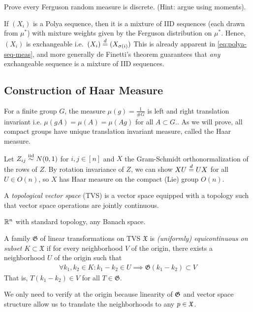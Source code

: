 \begin{exercise}
  Prove every Ferguson random measure is discrete.
  (Hint: argue using moments).
\end{exercise}


\begin{remark}
  If $(X_i)$ is a Polya sequence, then
  it is a mixture of IID sequences (each
  drawn from $\mu^*$) with mixture weights given by the Ferguson distribution
  on $\mu^*$. Hence, $(X_i)$ is exchangeable i.e.\ $(X_i) \overset{d}{=} (X_{\sigma(i)})$
  This is already apparent in \cref{eq:polya-seq-meas}, and more generally
  de Finetti's theorem guarantees that \emph{any} exchangeable sequence
  is a mixture of IID sequences.
\end{remark}

\subsection{Construction of Haar Measure}

For a finite group $G$, the measure $\mu(g) = \frac{1}{\# G}$ is
left and right translation invariant i.e. $\mu(gA) = \mu(A) = \mu(Ag)$
for all $A \subset G$..
As we will prove, all compact groups have unique translation invariant measure,
called the Haar measure.

\begin{example}
  Let $Z_{ij} \overset{\text{iid}}{\sim} N(0,1)$ for $i,j \in [n]$ and $X$ the Gram-Schmidt
  orthonormalization of the rows of $Z$.  By rotation invariance of $Z$, we can
  show $X U \overset{d}{=} U X$ for all $U \in O(n)$, so $X$ has Haar measure on the
  compact (Lie) group $O(n)$.
\end{example}


\begin{definition}
  A \emph{topological vector space} (TVS) is a vector space equipped with
  a topology such that vector space operations are jointly
  continuous.
\end{definition}

\begin{example}
  $\mathbb{R}^n$ with standard topology, any Banach space.
\end{example}

\begin{definition}
  \label{def:equicontinuous}
  A family $\mathfrak{G}$ of linear transformations on TVS
  $\mathfrak{X}$ is \emph{(uniformly) equicontinuous on subset $K \subset \mathfrak{X}$}
  if for every neighborhood $V$ of the origin, there exists a neighborhood
  $U$ of the origin such that
  \begin{align*}
    \forall k_1, k_2 \in K: k_1 - k_2 \in U \implies \mathfrak{G}(k_1 - k_2) \subset V
  \end{align*}
  That is, $T(k_1 - k_2) \in V$ for all $T \in \mathfrak{G}$.

  We only need to verify at the origin because linearity of $\mathfrak{G}$
  and vector space structure allow us to translate the neighborhoods
  to any $p \in \mathfrak{X}$.
\end{definition}

